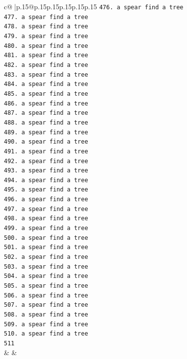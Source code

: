 \documentclass{article}
\begin{document}
{\begin{supertabular}{c@{$\;$}|p{.15\linewidth}@{}p{.15\linewidth}p{.15\linewidth}p{.15\linewidth}p{.15\linewidth}p{.15\linewidth}}
{{{\texttt{476. a spear find a tree} \\
\texttt{477. a spear find a tree} \\
\texttt{478. a spear find a tree} \\
\texttt{479. a spear find a tree} \\
\texttt{480. a spear find a tree} \\
\texttt{481. a spear find a tree} \\
\texttt{482. a spear find a tree} \\
\texttt{483. a spear find a tree} \\
\texttt{484. a spear find a tree} \\
\texttt{485. a spear find a tree} \\
\texttt{486. a spear find a tree} \\
\texttt{487. a spear find a tree} \\
\texttt{488. a spear find a tree} \\
\texttt{489. a spear find a tree} \\
\texttt{490. a spear find a tree} \\
\texttt{491. a spear find a tree} \\
\texttt{492. a spear find a tree} \\
\texttt{493. a spear find a tree} \\
\texttt{494. a spear find a tree} \\
\texttt{495. a spear find a tree} \\
\texttt{496. a spear find a tree} \\
\texttt{497. a spear find a tree} \\
\texttt{498. a spear find a tree} \\
\texttt{499. a spear find a tree} \\
\texttt{500. a spear find a tree} \\
\texttt{501. a spear find a tree} \\
\texttt{502. a spear find a tree} \\
\texttt{503. a spear find a tree} \\
\texttt{504. a spear find a tree} \\
\texttt{505. a spear find a tree} \\
\texttt{506. a spear find a tree} \\
\texttt{507. a spear find a tree} \\
\texttt{508. a spear find a tree} \\
\texttt{509. a spear find a tree} \\
\texttt{510. a spear find a tree} \\
\texttt{511} \\
            }
        }
    }
    & & \\ \\


\end{supertabular}}
\end{document}

